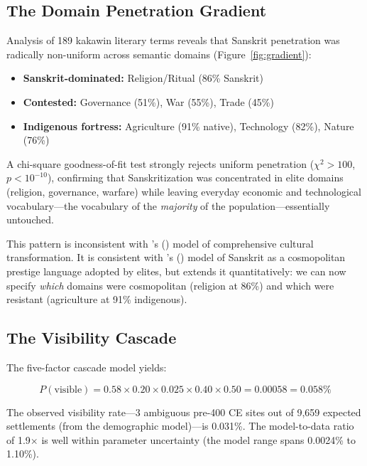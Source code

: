 \documentclass[12pt,a4paper]{article}
\begin{document}
\subsection{The Domain Penetration Gradient}

Analysis of 189 kakawin literary terms reveals that Sanskrit penetration was radically non-uniform across semantic domains (Figure~\ref{fig:gradient}):

\begin{itemize}
\item \textbf{Sanskrit-dominated:} Religion/Ritual (86\% Sanskrit)
\item \textbf{Contested:} Governance (51\%), War (55\%), Trade (45\%)
\item \textbf{Indigenous fortress:} Agriculture (91\% native), Technology (82\%), Nature (76\%)
\end{itemize}

A chi-square goodness-of-fit test strongly rejects uniform penetration ($\chi^2 > 100$, $p < 10^{-10}$), confirming that Sanskritization was concentrated in elite domains (religion, governance, warfare) while leaving everyday economic and technological vocabulary---the vocabulary of the \textit{majority} of the population---essentially untouched.

This pattern is inconsistent with \citeauthor{coedes1968}'s (\citeyear{coedes1968}) model of comprehensive cultural transformation. It is consistent with \citeauthor{pollock2006}'s (\citeyear{pollock2006}) model of Sanskrit as a cosmopolitan prestige language adopted by elites, but extends it quantitatively: we can now specify \textit{which} domains were cosmopolitan (religion at 86\%) and which were resistant (agriculture at 91\% indigenous).

\subsection{The Visibility Cascade}

The five-factor cascade model yields:

\begin{equation}
P(\text{visible}) = 0.58 \times 0.20 \times 0.025 \times 0.40 \times 0.50 = 0.00058 = 0.058\%
\end{equation}

The observed visibility rate---3 ambiguous pre-400 CE sites out of 9,659 expected settlements (from the demographic model)---is 0.031\%. The model-to-data ratio of 1.9$\times$ is well within parameter uncertainty (the model range spans 0.0024\% to 1.10\%).
\end{document}

